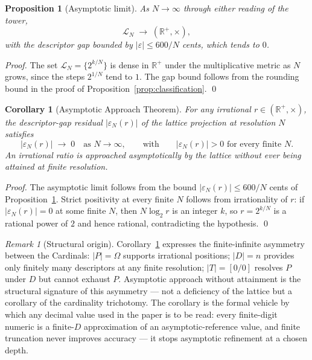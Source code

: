 \documentclass[11pt,a4paper]{article}
\newtheorem{corollary}[theorem]{Corollary}
\newtheorem{proposition}[theorem]{Proposition}
\theoremstyle{definition}
\theoremstyle{remark}
\newtheorem{remark}[theorem]{Remark}
\newcommand{\R}{\mathbb{R}}
\newcommand{\eps}{\varepsilon}
\begin{document}
\begin{proposition}[Asymptotic limit]\label{prop:limit}
As $N\to\infty$ through either reading of the tower,
\[
\mathcal{L}_{N} \;\longrightarrow\; (\R^{+},\times),
\]
with the descriptor gap bounded by $|\eps|\le 600/N$ cents, which tends to $0$.
\end{proposition}

\begin{proof}
The set $\mathcal{L}_{N}=\{2^{k/N}\}$ is dense in $\R^{+}$ under the multiplicative metric as $N$ grows, since the steps $2^{1/N}$ tend to $1$. The gap bound follows from the rounding bound in the proof of Proposition~\ref{prop:classification}. \qed
\end{proof}

\begin{corollary}[Asymptotic Approach Theorem]\label{cor:asymptotic-approach}
For any irrational $r \in (\R^{+},\times)$, the descriptor-gap residual $|\varepsilon_{N}(r)|$ of the lattice projection at resolution $N$ satisfies
\[
|\varepsilon_{N}(r)| \;\longrightarrow\; 0 \quad \text{as } N \to \infty, \qquad\text{with}\qquad |\varepsilon_{N}(r)| > 0 \text{ for every finite } N.
\]
An irrational ratio is approached asymptotically by the lattice without ever being attained at finite resolution.
\end{corollary}

\begin{proof}
The asymptotic limit follows from the bound $|\varepsilon_{N}(r)| \le 600/N$ cents of Proposition~\ref{prop:limit}. Strict positivity at every finite $N$ follows from irrationality of $r$: if $|\varepsilon_{N}(r)| = 0$ at some finite $N$, then $N \log_{2} r$ is an integer $k$, so $r = 2^{k/N}$ is a rational power of $2$ and hence rational, contradicting the hypothesis. \qed
\end{proof}

\begin{remark}[Structural origin]\label{rem:asymptotic-origin}
Corollary~\ref{cor:asymptotic-approach} expresses the finite-infinite asymmetry between the Cardinals: $|P| = \Omega$ supports irrational positions; $|D| = n$ provides only finitely many descriptors at any finite resolution; $|T|=[0/0]$ resolves $P$ under $D$ but cannot exhaust $P$. Asymptotic approach without attainment is the structural signature of this asymmetry --- not a deficiency of the lattice but a corollary of the cardinality trichotomy. The corollary is the formal vehicle by which any decimal value used in the paper is to be read: every finite-digit numeric is a finite-$D$ approximation of an asymptotic-reference value, and finite truncation never improves accuracy --- it stops asymptotic refinement at a chosen depth.
\end{remark}
\end{document}
